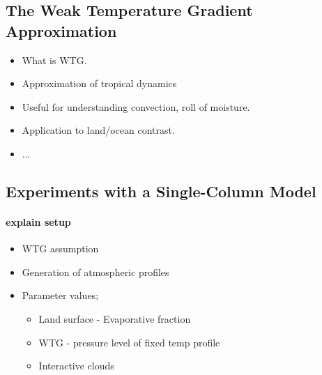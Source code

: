 \subsection{The Weak Temperature Gradient Approximation}
\begin{itemize}
	\item What is WTG.
	\item Approximation of tropical dynamics
	\item Useful for understanding convection, roll of moisture.
	\item Application to land/ocean contrast.
	\item ...
\end{itemize}

\subsection{Experiments with a Single-Column Model}
\label{sec:mech_scm}
\paragraph{explain setup}
\begin{itemize}
	\item WTG assumption
	\item Generation of atmospheric profiles
	\item Parameter values;
		\begin{itemize}
			\item Land surface - Evaporative fraction
			\item WTG - pressure level of fixed temp profile
			\item Interactive clouds
		\end{itemize}
\end{itemize}
